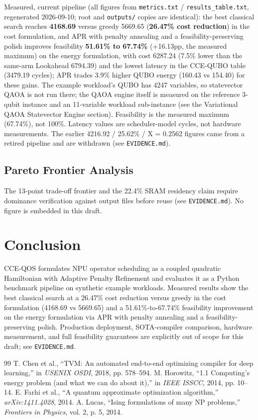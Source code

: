 \documentclass[journal]{IEEEtran}
\theoremstyle{definition}
\begin{document}
Measured, current pipeline (all figures from \texttt{metrics.txt} / \texttt{results\_table.txt}, regenerated 2026-09-10; root and \texttt{outputs/} copies are identical): the best classical search reaches \textbf{4168.69} versus greedy 5669.65 (\textbf{26.47\% cost reduction}) in the cost formulation, and APR with penalty annealing and a feasibility-preserving polish improves feasibility \textbf{51.61\% to 67.74\%} (+16.13pp, the measured maximum) on the energy formulation, with cost 6287.24 (7.5\% lower than the same-arm Lookahead 6794.39) and the lowest latency in the CCE-QUBO table (3479.19 cycles); APR trades 3.9\% higher QUBO energy (160.43 vs 154.40) for these gains. The example workload's QUBO has 4247 variables, so statevector QAOA is not run there; the QAOA engine itself is measured on the reference 3-qubit instance and an 11-variable workload sub-instance (see the Variational QAOA Statevector Engine section). Feasibility is the measured maximum (67.74\%), not 100\%. Latency values are scheduler-model cycles, not hardware measurements. The earlier 4216.92 / 25.62\% / X = 0.2562 figures came from a retired pipeline and are withdrawn (see \texttt{EVIDENCE.md}).

\subsection{Pareto Frontier Analysis}
The 13-point trade-off frontier and the 22.4\% SRAM residency claim require dominance verification against output files before reuse (see \texttt{EVIDENCE.md}). No figure is embedded in this draft.

\section{Conclusion}
CCE-QOS formulates NPU operator scheduling as a coupled quadratic Hamiltonian with Adaptive Penalty Refinement and evaluates it as a Python benchmark pipeline on synthetic example workloads. Measured results show the best classical search at a 26.47\% cost reduction versus greedy in the cost formulation (4168.69 vs 5669.65) and a 51.61\%-to-67.74\% feasibility improvement on the energy formulation via APR with penalty annealing and a feasibility-preserving polish. Production deployment, SOTA-compiler comparison, hardware measurement, and full feasibility guarantees are explicitly out of scope for this draft; see \texttt{EVIDENCE.md}.


\begin{thebibliography}{99}
 T. Chen et al., ``TVM: An automated end-to-end optimizing compiler for deep learning,'' in \emph{USENIX OSDI}, 2018, pp. 578--594.
 M. Horowitz, ``1.1 Computing's energy problem (and what we can do about it),'' in \emph{IEEE ISSCC}, 2014, pp. 10--14.
 E. Farhi et al., ``A quantum approximate optimization algorithm,'' \emph{arXiv:1411.4028}, 2014.
 A. Lucas, ``Ising formulations of many NP problems,'' \emph{Frontiers in Physics}, vol. 2, p. 5, 2014.
\end{thebibliography}
\end{document}
